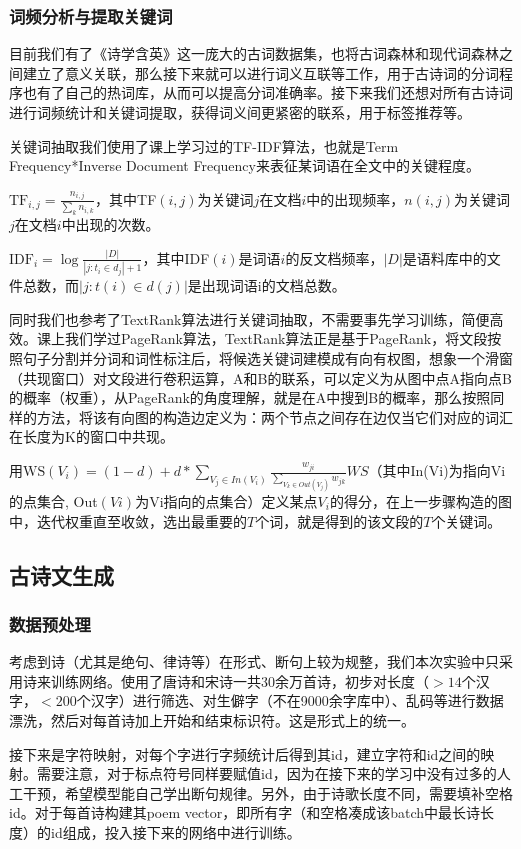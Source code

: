 \documentclass[a4paper, 10pt]{article}
\begin{document}
\subsubsection*{词频分析与提取关键词}
目前我们有了《诗学含英》这一庞大的古词数据集，也将古词森林和现代词森林之间建立了意义关联，那么接下来就可以进行词义互联等工作，用于古诗词的分词程序也有了自己的热词库，从而可以提高分词准确率。接下来我们还想对所有古诗词进行词频统计和关键词提取，获得词义间更紧密的联系，用于标签推荐等。

关键词抽取我们使用了课上学习过的TF-IDF算法，也就是Term Frequency*Inverse Document Frequency来表征某词语在全文中的关键程度。

$\displaystyle \mathrm{TF}_{i,j}=\frac{n_{i,j}}{\sum_k{n_{i,k}}}$，其中TF$(i,j)$为关键词$j$在文档$i$中的出现频率，$n(i,j)$为关键词$j$在文档$i$中出现的次数。

$\displaystyle \mathrm{IDF}_i=\log\frac{|D|}{|j:t_i∈d_j|+1}$，其中IDF$(i)$是词语$i$的反文档频率，$|D|$是语料库中的文件总数，而$|j:t(i)\in d(j)|$是出现词语i的文档总数。

同时我们也参考了TextRank算法进行关键词抽取，不需要事先学习训练，简便高效。课上我们学过PageRank算法，TextRank算法正是基于PageRank，将文段按照句子分割并分词和词性标注后，将候选关键词建模成有向有权图，想象一个滑窗（共现窗口）对文段进行卷积运算，A和B的联系，可以定义为从图中点A指向点B的概率（权重），从PageRank的角度理解，就是在A中搜到B的概率，那么按照同样的方法，将该有向图的构造边定义为：两个节点之间存在边仅当它们对应的词汇在长度为K的窗口中共现。

用$\displaystyle \mathrm{WS}(V_i)=(1-d)+d*\sum_{V_j∈In(V_i)}\frac{w_{ji}}{\sum_{V_k∈Out(V_j)}w_{jk}}WS$（其中In(Vi)为指向Vi的点集合, Out$(Vi)$为Vi指向的点集合）定义某点$V_i$的得分，在上一步骤构造的图中，迭代权重直至收敛，选出最重要的$T$个词，就是得到的该文段的$T$个关键词。

\subsection{古诗文生成}
\subsubsection*{数据预处理}
考虑到诗（尤其是绝句、律诗等）在形式、断句上较为规整，我们本次实验中只采用诗来训练网络。使用了唐诗和宋诗一共30余万首诗，初步对长度（$>14$个汉字，$<200$个汉字）进行筛选、对生僻字（不在9000余字库中）、乱码等进行数据漂洗，然后对每首诗加上开始和结束标识符。这是形式上的统一。

接下来是字符映射，对每个字进行字频统计后得到其id，建立字符和id之间的映射。需要注意，对于标点符号同样要赋值id，因为在接下来的学习中没有过多的人工干预，希望模型能自己学出断句规律。另外，由于诗歌长度不同，需要填补空格id。对于每首诗构建其poem vector，即所有字（和空格凑成该batch中最长诗长度）的id组成，投入接下来的网络中进行训练。
\end{document}
